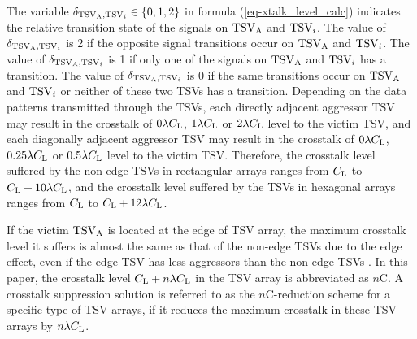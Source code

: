\documentclass[lettersize,journal]{IEEEtran}
\begin{document}
The variable $\delta_{{\rm TSV_A},{\rm TSV}_i}\in \{0,1,2\}$ in formula (\ref{eq-xtalk_level_calc}) indicates the relative transition state of the signals on $\rm TSV_A$ and ${\rm TSV}_i$. The value of $\delta_{{\rm TSV_A},{\rm TSV}_i}$ is 2 if the opposite signal transitions occur on $\rm TSV_A$ and ${\rm TSV}_i$. The value of $\delta_{{\rm TSV_A},{\rm TSV}_i}$ is 1 if only one of the signals on $\rm TSV_A$ and ${\rm TSV}_i$ has a transition. The value of $\delta_{{\rm TSV_A},{\rm TSV}_i}$ is 0 if the same transitions occur on $\rm TSV_A$ and ${\rm TSV}_i$ or neither of these two TSVs has a transition. Depending on the data patterns transmitted through the TSVs, each directly adjacent aggressor TSV may result in the crosstalk of $0\lambda C_{\rm L}$, $1\lambda C_{\rm L}$ or $2\lambda C_{\rm L}$ level to the victim TSV, and each diagonally adjacent aggressor TSV may result in the crosstalk of $0\lambda C_{\rm L}$, $0.25\lambda C_{\rm L}$ or  $0.5\lambda C_{\rm L}$ level to the victim TSV. Therefore, the crosstalk level suffered by the non-edge TSVs in rectangular arrays ranges from $C_{\rm L}$ to $C_{\rm L}+10\lambda C_{\rm L}$, and the crosstalk level suffered by the TSVs in hexagonal arrays ranges from $C_{\rm L}$ to $C_{\rm L}+12\lambda C_{\rm L}$. 

If the victim $\rm TSV_A$ is located at the edge of TSV array, the maximum crosstalk level it suffers is almost the same as that of the non-edge TSVs due to the edge effect, even if the edge TSV has less aggressors than the non-edge TSVs \cite{A24_Bamberg_8106994,A25_BAMBERG201998}. In this paper, the crosstalk level $C_{\rm L}+n\lambda C_{\rm L}$ in the TSV array is abbreviated as $n$C. A crosstalk suppression solution is referred to as the $n$C-reduction scheme for a specific type of TSV arrays, if it reduces the maximum crosstalk in these TSV arrays by $n\lambda C_{\rm L}$.
\end{document}

